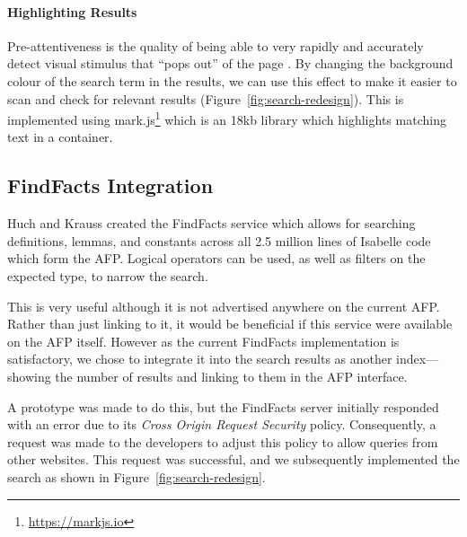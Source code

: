 \documentclass[bsc,frontabs,oneside,singlespacing,parskip,deptreport,logo]{infthesis}
\begin{document}
\paragraph*{Highlighting Results}

Pre-attentiveness is the quality of being able to very rapidly and accurately detect visual stimulus that ``pops out'' of the page \cite{healey2012attention}. By changing the background colour of the search term in the results, we can use this effect to make it easier to scan and check for relevant results (Figure~\ref{fig:search-redesign}). This is implemented using mark.js\footnote{\url{https://markjs.io}} which is an 18kb library which highlights matching text in a container.%

\subsection{FindFacts Integration}

Huch and Krauss created the FindFacts service \cite{HuchKrauss} which allows for searching definitions, lemmas, and constants across all 2.5 million lines of Isabelle code which form the AFP. Logical operators can be used, as well as filters on the expected type, to narrow the search. 

This is very useful although it is not advertised anywhere on the current AFP. Rather than just linking to it, it would be beneficial if this service were available on the AFP itself. However as the current FindFacts implementation is satisfactory, we chose to integrate it into the search results as another index---showing the number of results and linking to them in the AFP interface. 

A prototype was made to do this, but the FindFacts server initially responded with an error due to its \emph{Cross Origin Request Security} policy. Consequently, a request was made to the developers to  adjust this policy to allow queries from other websites. This request was successful, and we subsequently implemented the search as shown in Figure~\ref{fig:search-redesign}.
\end{document}
